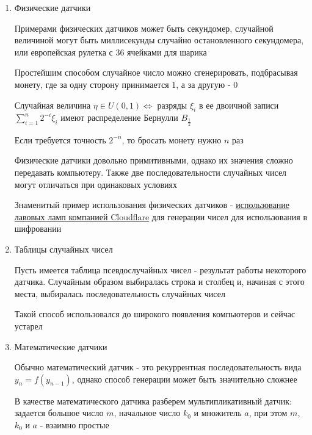 \documentclass[12pt]{article}
\begin{document}
\begin{enumerate}[label*=\Roman*. ]
    \item Физические датчики

    Примерами физических датчиков может быть секундомер, случайной величиной могут быть миллисекунды случайно остановленного секундомера, или европейская рулетка с 36 ячейками для шарика

    Простейшим способом случайное число можно сгенерировать, подбрасывая монету, где за одну сторону принимается 1, а за другую - 0

    \begin{MyTheorem}
        \Ths Случайная величина $\eta \in U(0, 1) \Longleftrightarrow$ разряды $\xi_i$ в ее двоичной записи $\sum_{i = 1}^n 2^{-i} \xi_i$ имеют распределение Бернулли $B_{\frac{1}{2}}$
    \end{MyTheorem}

    Если требуется точность $2^{-n}$, то бросать монету нужно $n$ раз 

    Физические датчики довольно примитивными, однако их значения сложно передавать компьютеру. Также две последовательности случайных чисел могут отличаться при одинаковых условиях

    Знаменитый пример использования физических датчиков - \href{https://www.cloudflare.com/learning/ssl/lava-lamp-encryption/}{использование лавовых ламп компанией Cloudflare} для генерации чисел для использования в шифровании

    \item Таблицы случайных чисел

    Пусть имеется таблица псевдослучайных чисел - результат работы некоторого датчика. Случайным образом выбиралась строка и столбец и, начиная с этого места, выбиралась последовательность случайных чисел

    Такой способ использовался до широкого появления компьютеров и сейчас устарел

    \hypertarget{mathematical_rng}{}

    \item Математические датчики

    Обычно математический датчик - это рекуррентная последовательность вида $y_n = f(y_{n - 1})$, однако способ генерации может быть значительно сложнее

    В качестве математического датчика разберем мультипликативный датчик: задается большое число $m$, начальное число $k_0$ и множитель $a$, при этом $m$, $k_0$ и $a$ - взаимно простые


\end{enumerate}
\end{document}
